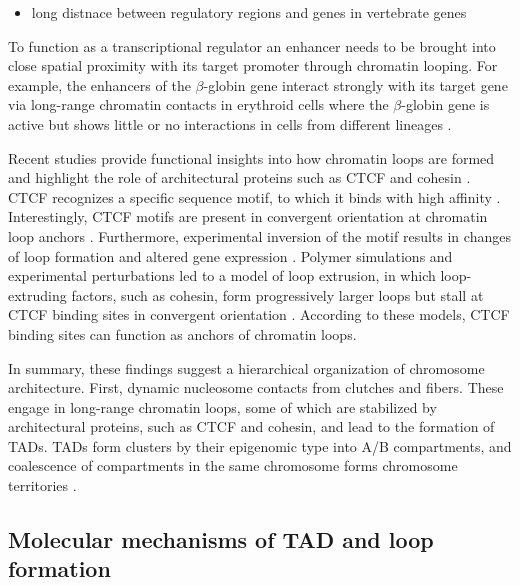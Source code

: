 \documentclass[a4paper,twoside=true,openright,parskip=full,chapterprefix=true,11pt,headings=normal,bibliography=totoc,listof=totoc,titlepage=on,captions=tableabove,draft=false]{scrreprt}
\providecommand{\tightlist}{%
  \setlength{\itemsep}{0pt}\setlength{\parskip}{0pt}}
\theoremstyle{definition}
\theoremstyle{definition}
\theoremstyle{definition}
\theoremstyle{remark}
\begin{document}
\begin{itemize}
\tightlist
\item
  long distnace between regulatory regions and genes in vertebrate genes
\end{itemize}

To function as a transcriptional regulator an enhancer needs to be
brought into close spatial proximity with its target promoter through
chromatin looping. For example, the enhancers of the \(\beta\)-globin
gene interact strongly with its target gene via long-range chromatin
contacts in erythroid cells where the \(\beta\)-globin gene is active
but shows little or no interactions in cells from different lineages
\citep{Palstra2003}.

Recent studies provide functional insights into how chromatin loops are
formed and highlight the role of architectural proteins such as CTCF and
cohesin \citep{Merkenschlager2016}. CTCF recognizes a specific sequence
motif, to which it binds with high affinity \citep{Kim2007, Nagy2016}.
Interestingly, CTCF motifs are present in convergent orientation at
chromatin loop anchors \citep{Rao2014, Tang2015, VietriRudan2015}.
Furthermore, experimental inversion of the motif results in changes of
loop formation and altered gene expression \citep{Guo2015, deWit2015}.
Polymer simulations and experimental perturbations led to a model of
loop extrusion, in which loop-extruding factors, such as cohesin, form
progressively larger loops but stall at CTCF binding sites in convergent
orientation \citep{Sanborn2015, Fudenberg2016}. According to these
models, CTCF binding sites can function as anchors of chromatin loops.

In summary, these findings suggest a hierarchical organization of
chromosome architecture. First, dynamic nucleosome contacts from
clutches and fibers. These engage in long-range chromatin loops, some of
which are stabilized by architectural proteins, such as CTCF and
cohesin, and lead to the formation of TADs. TADs form clusters by their
epigenomic type into A/B compartments, and coalescence of compartments
in the same chromosome forms chromosome territories \citep{Bonev2016}.

\hypertarget{molecular-mechanisms-of-tad-and-loop-formation}{%
\subsection{Molecular mechanisms of TAD and loop
formation}\label{molecular-mechanisms-of-tad-and-loop-formation}}
\end{document}
